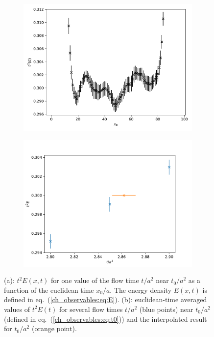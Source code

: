 \begin{figure}
    \begin{subfigure}{1.\textwidth}
    	\includegraphics[width=\textwidth]{./cap3/figs/t2E_vs_x0.pdf}
    	\caption{}
    \end{subfigure}
    \begin{subfigure}{1.\textwidth}
    	\includegraphics[width=\textwidth]{./cap3/figs/t2E_vs_t.pdf}
    	\caption{}
    \end{subfigure}
    \caption{(a): $t^2E(x,t)$ for one value of the flow time $t/a^2$ near $t_0/a^2$ as a function of the euclidean time $x_0/a$. The energy density $E(x,t)$ is defined in eq.~(\ref{ch_observables:eq:E}). (b): euclidean-time averaged values of $t^2E(t)$ for several flow times $t/a^2$ (blue points) near $t_0/a^2$ (defined in eq.~(\ref{ch_observables:eq:t0})) and the interpolated result for $t_0/a^2$ (orange point).}
        \label{ch_observables:fig:t2E}
\end{figure}

